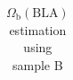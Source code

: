 \begin{table}[!h]
\begin{tabular}{ccccccc}

            

            \hline \hline 
        \end{tabular}
    \caption{$\Omega_\text{b}(\text{BLA})$ estimation using sample B}
    \label{tab:Omega_b_sampleB}
\end{table}

